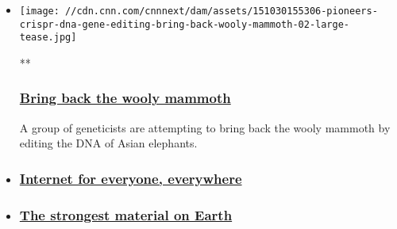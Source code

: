 \begin{itemize}
\item
  \href{/videos/us/2015/10/30/orig-human-dna-genome-editing-crispr-cas9-wooly-mammoth-pioneers.cnn}{}

  \texttt{[image: //cdn.cnn.com/cnnnext/dam/assets/151030155306-pioneers-crispr-dna-gene-editing-bring-back-wooly-mammoth-02-large-tease.jpg]}

  **

  \hypertarget{bring-back-the-wooly-mammoth}{%
  \subsubsection{\texorpdfstring{\href{/videos/us/2015/10/30/orig-human-dna-genome-editing-crispr-cas9-wooly-mammoth-pioneers.cnn}{Bring
  back the wooly
  mammoth}}{Bring back the wooly mammoth}}\label{bring-back-the-wooly-mammoth}}

  A group of geneticists are attempting to bring back the wooly mammoth
  by editing the DNA of Asian elephants.
\item
  \hypertarget{internet-for-everyone-everywhere}{%
  \subsubsection{\texorpdfstring{\href{/videos/us/2015/10/30/orig-ff-satellite-internet-oneweb-pioneers.cnn}{Internet
  for everyone,
  everywhere}}{Internet for everyone, everywhere}}\label{internet-for-everyone-everywhere}}
\item
  \hypertarget{the-strongest-material-on-earth}{%
  \subsubsection{\texorpdfstring{\href{/videos/us/2015/10/30/orig-ff-strongest-material-graphene-pioneers.cnn}{The
  strongest material on
  Earth}}{The strongest material on Earth}}\label{the-strongest-material-on-earth}}
\end{itemize}

